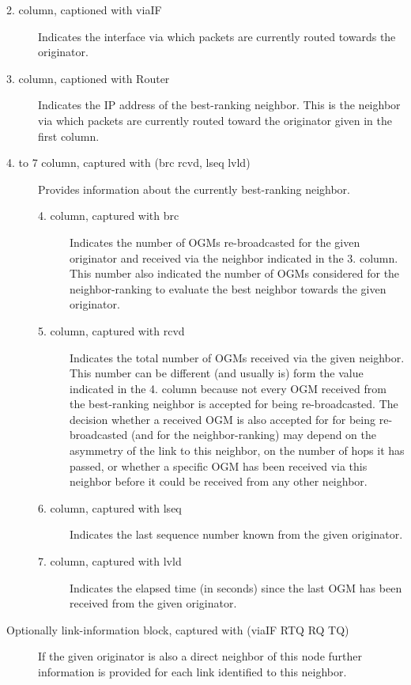 \documentclass[11pt]{article}
\begin{document}
\begin{description}
 \item[2. column, captioned with viaIF] Indicates the interface via which packets are currently routed towards the originator.

 \item[3. column, captioned with Router] Indicates the IP address of the best-ranking neighbor. This is the neighbor via which packets are currently routed toward the originator given in the first column.

 \item[4. to 7 column, captured with (brc rcvd, lseq lvld)] Provides information about the currently best-ranking neighbor.

\begin{description}

\item[4. column, captured with brc] Indicates the number of OGMs re-broadcasted for the given originator and received via the neighbor indicated in the 3. column. This number also indicated the number of OGMs considered for the neighbor-ranking to evaluate the best neighbor towards the given originator.

\item[5. column, captured with rcvd] Indicates the total number of OGMs received via the given neighbor. This number can be different (and usually is) form the value indicated in the 4. column because not every OGM received from the best-ranking neighbor is accepted for being re-broadcasted. The decision whether a received OGM is also accepted for for being re-broadcasted (and for the neighbor-ranking) may depend on the asymmetry of the link to this neighbor, on the number of hops it has passed, or whether a specific OGM has been received via this neighbor before it could be received from any other neighbor.

\item [6. column, captured with lseq] Indicates the last sequence number known from the given originator.

\item [7. column, captured with lvld] Indicates the elapsed time (in seconds) since the last OGM has been received from the given originator.

 \end{description}

\item[Optionally link-information block, captured with (viaIF RTQ RQ TQ)] If the given originator is also a direct neighbor of this node further information is provided for each link identified to this neighbor.


\end{description}
\end{document}
